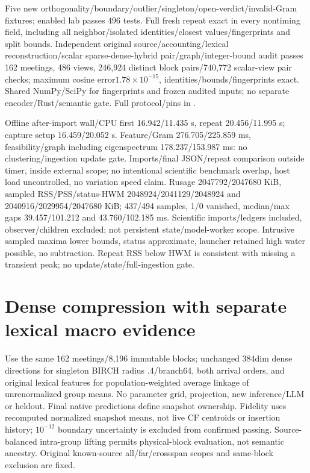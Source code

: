 \documentclass[11pt]{article}
\begin{document}
Five new orthogonality/boundary/outlier/singleton/open-verdict/invalid-Gram fixtures;
enabled lab passes 496 tests. Full fresh repeat exact in every nontiming field,
including all neighbor/isolated identities/closest values/fingerprints and split
bounds. Independent original source/accounting/lexical reconstruction/scalar
sparse-dense-hybrid pair/graph/integer-bound audit passes 162 meetings, 486 views,
246,924 distinct block pairs/740,772 scalar-view pair checks; maximum cosine
error$1.78\times10^{-15}$, identities/bounds/fingerprints exact. Shared NumPy/SciPy
for fingerprints and frozen audited inputs; no separate encoder/Rust/semantic
gate. Full protocol/pins in
.

Offline after-import wall/CPU first 16.942/11.435 s, repeat 20.456/11.995 s;
capture setup 16.459/20.052 s. Feature/Gram 276.705/225.859 ms, feasibility/graph
including eigenspectrum 178.237/153.987 ms: no clustering/ingestion update gate.
Imports/final JSON/repeat comparison outside timer, inside external scope; no
intentional scientific benchmark overlap, host load uncontrolled, no variation
speed claim. Rusage 2047792/2047680 KiB, sampled RSS/PSS/status-HWM
2048924/2041129/2048924 and 2040916/2029954/2047680 KiB;
437/494 samples, 1/0 vanished, median/max gaps 39.457/101.212 and 43.760/102.185 ms.
Scientific imports/ledgers included, observer/children excluded; not persistent
state/model-worker scope. Intrusive sampled maxima lower bounds, status approximate,
launcher retained high water possible, no subtraction. Repeat RSS below HWM is
consistent with missing a transient peak; no update/state/full-ingestion gate.

\section{Dense compression with separate lexical macro evidence}
Use the same 162 meetings/8,196 immutable blocks; unchanged 384dim dense
directions for singleton BIRCH radius .4/branch64, both arrival orders, and
original lexical features for population-weighted average linkage of
unrenormalized group means. No parameter grid, projection, new inference/LLM or
heldout. Final native predictions define snapshot ownership. Fidelity uses
recomputed normalized snapshot means, not live CF centroids or insertion history;
$10^{-12}$ boundary uncertainty is excluded from confirmed passing. Source-balanced
intra-group lifting permits physical-block evaluation, not semantic ancestry.
Original known-source all/far/crossspan scopes and same-block exclusion are fixed.
\end{document}
